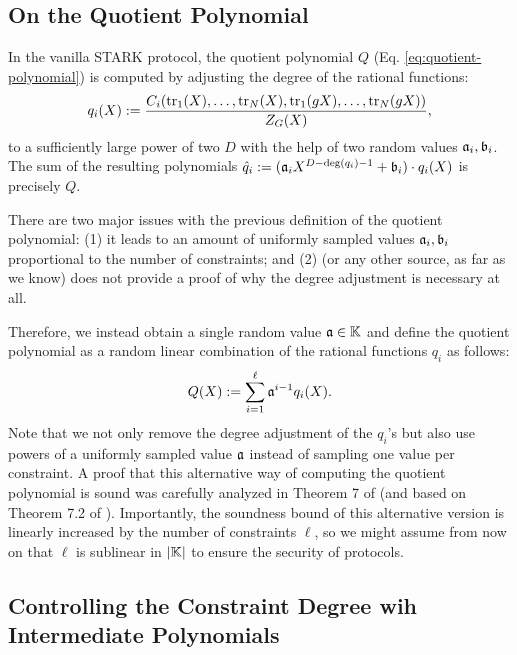 \subsection{On the Quotient Polynomial}\label{sec:quotient-polynomial}

In the vanilla STARK protocol, the quotient polynomial $Q$ (Eq. \ref{eq:quotient-polynomial}) is computed by adjusting the degree of the rational functions:
\[
  q_i(X) := \frac{C_i(\text{tr}_1(X), \dots, \text{tr}_N(X), \text{tr}_1(gX), \dots, \text{tr}_N(gX))}{Z_{G}(X)},
\]
to a sufficiently large power of two $D$ with the help of two random values $\mathfrak{a}_i,\mathfrak{b}_i$. The sum of the resulting polynomials $\hat{q}_i := (\mathfrak{a}_iX^{D-\deg(q_i)-1} + \mathfrak{b}_i) \cdot q_i(X)$ is precisely $Q$. 

There are two major issues with the previous definition of the quotient polynomial: (1) it leads to an amount of uniformly sampled values $\mathfrak{a}_i,\mathfrak{b}_i$ proportional to the number of constraints; and (2) \cite{EPRINT:StarkWare21} (or any other source, as far as we know) does not provide a proof of why the degree adjustment is necessary at all. 

Therefore, we instead obtain a single random value $\mathfrak{a} \in \mathbb{K}$ and define the quotient polynomial as a random linear combination of the rational functions $q_i$ as follows:
\[
  Q(X) := \sum_{i=1}^{\ell} \mathfrak{a}^{i-1} q_i(X).
\]
Note that we not only remove the degree adjustment of the $q_i$'s but also use powers of a uniformly sampled value $\mathfrak{a}$ instead of sampling one value per constraint. A proof that this alternative way of computing the quotient polynomial is sound was carefully analyzed in Theorem 7 of \cite{EPRINT:Habock22} (and based on Theorem 7.2 of \cite{EPRINT:BCIKS20}). Importantly, the soundness bound of this alternative version is linearly increased by the number of constraints $\ell$, so we might assume from now on that $\ell$ is sublinear in $|\mathbb{K}|$ to ensure the security of protocols.

\subsection{Controlling the Constraint Degree wih Intermediate Polynomials}\label{sec:controlling-degree}

